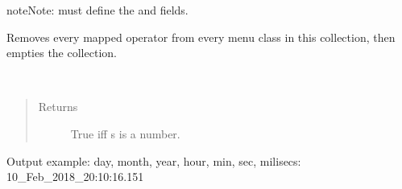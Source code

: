 \documentclass[letterpaper,10pt,english,openany,oneside]{sphinxmanual}
\begin{document}
\begin{fulllineitems}
\begin{fulllineitems}
\begin{quote}
\begin{description}
\begin{itemize}
\end{itemize}

\end{description}\end{quote}

\begin{sphinxadmonition}{note}{Note:}
 must define the  and  fields.
\end{sphinxadmonition}

\end{fulllineitems}


\begin{fulllineitems}
\label{\detokenize{io_anim_mvnx:io_anim_mvnx.utils.OperatorToMenuManager.unregister}}
Removes every mapped operator from every menu class in this collection,
then empties the collection.

\end{fulllineitems}


\end{fulllineitems}


\begin{fulllineitems}
\label{\detokenize{io_anim_mvnx:io_anim_mvnx.utils.is_number}}~\begin{quote}\begin{description}
\item[{Returns}] \leavevmode
True iff s is a number.

\end{description}\end{quote}

\end{fulllineitems}


\begin{fulllineitems}
\label{\detokenize{io_anim_mvnx:io_anim_mvnx.utils.make_timestamp}}
Output example: day, month, year, hour, min, sec, milisecs:
10\_Feb\_2018\_20:10:16.151

\end{fulllineitems}
\end{document}
